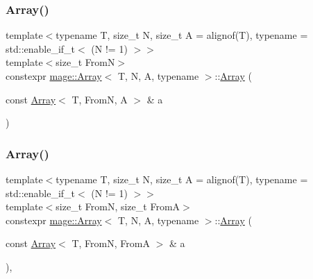 \subsubsection{\texorpdfstring{Array()}{Array()}\hspace{0.1cm}{\footnotesize\ttfamily [4/10]}}
{\footnotesize\ttfamily template$<$typename T, size\+\_\+t N, size\+\_\+t A = alignof(\+T), typename  = std\+::enable\+\_\+if\+\_\+t$<$ (\+N != 1) $>$$>$ \\
template$<$size\+\_\+t FromN$>$ \\
constexpr \mbox{\hyperlink{structmage_1_1_array}{mage\+::\+Array}}$<$ T, N, A, typename $>$\+::\mbox{\hyperlink{structmage_1_1_array}{Array}} (\begin{DoxyParamCaption}\item[{const \mbox{\hyperlink{structmage_1_1_array}{Array}}$<$ T, FromN, A $>$ \&}]{a }\end{DoxyParamCaption})\hspace{0.3cm}{\ttfamily [noexcept]}}

\mbox{\label{structmage_1_1_array_ac747c6b1fad2e919e3370cbe6b2937f5}} 
\subsubsection{\texorpdfstring{Array()}{Array()}\hspace{0.1cm}{\footnotesize\ttfamily [5/10]}}
{\footnotesize\ttfamily template$<$typename T, size\+\_\+t N, size\+\_\+t A = alignof(\+T), typename  = std\+::enable\+\_\+if\+\_\+t$<$ (\+N != 1) $>$$>$ \\
template$<$size\+\_\+t FromN, size\+\_\+t FromA$>$ \\
constexpr \mbox{\hyperlink{structmage_1_1_array}{mage\+::\+Array}}$<$ T, N, A, typename $>$\+::\mbox{\hyperlink{structmage_1_1_array}{Array}} (\begin{DoxyParamCaption}\item[{const \mbox{\hyperlink{structmage_1_1_array}{Array}}$<$ T, FromN, FromA $>$ \&}]{a }\end{DoxyParamCaption})\hspace{0.3cm}{\ttfamily [explicit]}, {\ttfamily [noexcept]}}

\mbox{\label{structmage_1_1_array_a128de416259f75f7b4ab8ab2e1ba9bd7}} 
